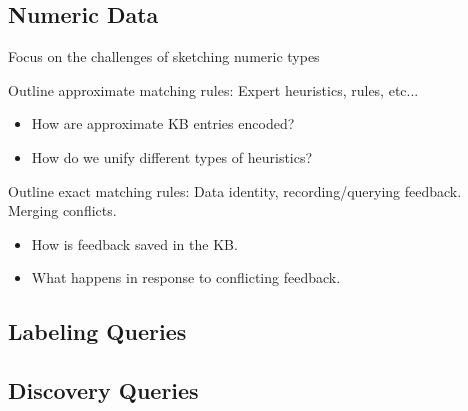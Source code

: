 \subsection{Numeric Data}
Focus on the challenges of sketching numeric types

Outline approximate matching rules: Expert heuristics, rules, etc...
\begin{itemize}
  \item How are approximate KB entries encoded?
  \item How do we unify different types of heuristics?
\end{itemize}



Outline exact matching rules: Data identity, recording/querying feedback.  Merging conflicts.

\begin{itemize}
  \item How is feedback saved in the KB.
  \item What happens in response to conflicting feedback.  
\end{itemize}



\subsection{Labeling Queries}

\subsection{Discovery Queries}

